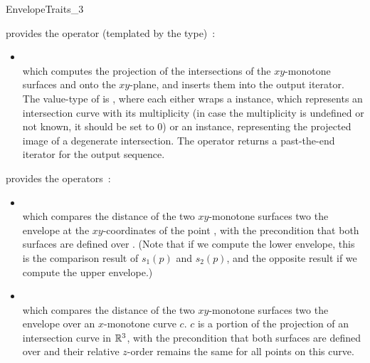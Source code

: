 \begin{ccRefConcept}{EnvelopeTraits_3}
{provides the operator (templated by the  type)~:
 \begin{itemize}
 \item {} \\
 which computes the projection of the intersections of the
 $xy$-monotone surfaces  and  onto the $xy$-plane,
 and inserts them into the output iterator.
 The value-type of  is , where
 each  either wraps a 
 instance, which represents an intersection curve with its
 multiplicity (in case the multiplicity is undefined or not known, it
 should be set to $0$) or an  instance, representing the
 projected image of a degenerate intersection.
 The operator returns a past-the-end iterator for the output sequence.
 \end{itemize}}

{provides the operators~:
 \begin{itemize}
 \item {}\\
 which compares the distance of the two $xy$-monotone surfaces two
 the envelope at the $xy$-coordinates of the point , with the
 precondition that both surfaces are defined over .
 (Note that if we compute the lower envelope, this is the comparison
 result of $s_1(p)$ and $s_2(p)$, and the opposite result if we compute
 the upper envelope.)
%
 \item {}\\
 which compares the distance of the two $xy$-monotone surfaces two
 the envelope over an $x$-monotone curve $c$. $c$ is a portion of the
 projection of an intersection curve in $\mathbb{R}^3$, with the 
 precondition that both surfaces are defined over  and their
 relative $z$-order remains the same for all points on this curve.
 \end{itemize}}


\end{ccRefConcept}
